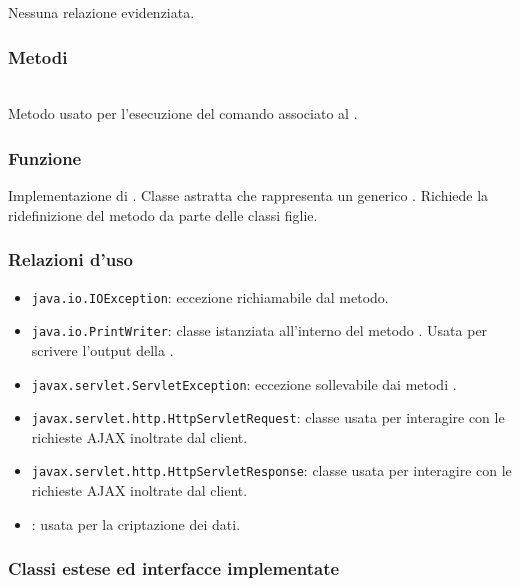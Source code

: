 Nessuna relazione evidenziata.

\subsubsection*{Metodi}
\begin{description}
	\item{}\\
	Metodo usato per l'esecuzione del comando associato al .
\end{description}


\subsubsection*{Funzione}
Implementazione di . Classe astratta che rappresenta un generico . Richiede la ridefinizione del metodo  da parte delle classi figlie.

\subsubsection*{Relazioni d'uso}
\begin{itemize}
	\item \texttt{java.io.IOException}: eccezione richiamabile dal metodo.
	\item \texttt{java.io.PrintWriter}: classe istanziata all'interno del metodo . Usata per scrivere l'output della .
	\item \texttt{javax.servlet.ServletException}: eccezione sollevabile dai metodi .
	\item \texttt{javax.servlet.http.HttpServletRequest}: classe usata per interagire con le richieste AJAX inoltrate dal client.
	\item \texttt{javax.servlet.http.HttpServletResponse}: classe usata per interagire con le richieste AJAX inoltrate dal client.
	\item {}: usata per la criptazione dei dati.
\end{itemize}

\subsubsection*{Classi estese ed interfacce implementate}

